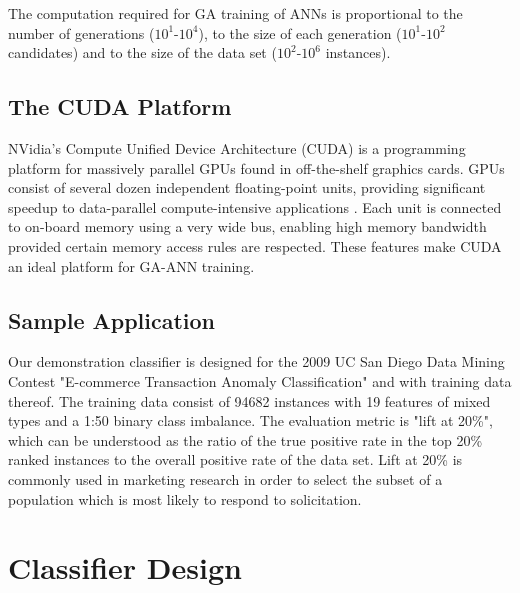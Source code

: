 \documentclass[11pt]{article}       %
\begin{document}
The computation required for GA training of ANNs is proportional to the number of generations ($10^1$-$10^4$), to the size of each generation ($10^1$-$10^2$ candidates) and to the size of the data set ($10^2$-$10^6$ instances).

\subsection{The CUDA Platform} \label{cuda}
NVidia's Compute Unified Device Architecture (CUDA) is a programming platform for massively parallel GPUs found in off-the-shelf graphics cards. GPUs consist of several dozen independent floating-point units, providing significant speedup to data-parallel compute-intensive applications \cite{cuda}. Each unit is connected to on-board memory using a very wide bus, enabling high memory bandwidth provided certain memory access rules are respected. These features make CUDA an ideal platform for GA-ANN training.

\subsection{Sample Application} \label{contest}
Our demonstration classifier is designed for the 2009 UC San Diego Data Mining Contest "E-commerce Transaction Anomaly Classification" \cite{UCSG-Contest} and with training data thereof. The training data consist of 94682 instances with 19 features of mixed types and a 1:50 binary class imbalance. The evaluation metric is "lift at 20\%", which can be understood as the ratio of the true positive rate in the top 20\% ranked instances to the overall positive rate of the data set.  Lift at 20\% is commonly used in marketing research in order to select the subset of a population which is most likely to respond to solicitation.

\section{Classifier Design} \label{design}
\end{document}

